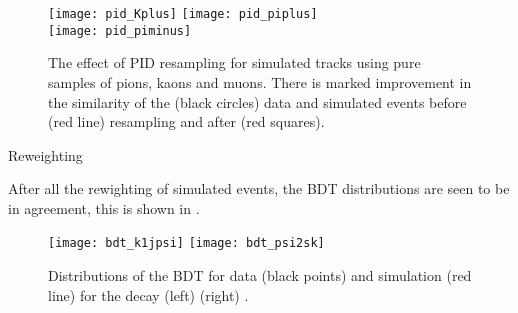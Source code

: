 \begin{figure}
  \begin{center}
    \texttt{[image: pid\_Kplus]}
    \texttt{[image: pid\_piplus]}\\
    \texttt{[image: pid\_piminus]}
    \caption{\small
      The effect of PID resampling for simulated tracks using pure samples of pions, kaons and
      muons.
      There is marked improvement in the similarity of the (black circles) \btojpsikpipi data and
      simulated events before (red line) resampling and after (red squares).
    }
    \label{fig:hhh:pid}
  \end{center}
\end{figure}

Reweighting

After all the rewighting of simulated events, the BDT distributions are seen to be in agreement,
this is shown in .











\begin{figure}
  \begin{center}
    \texttt{[image: bdt\_k1jpsi]}
    \texttt{[image: bdt\_psi2sk]}
    \caption{\small
      Distributions of the BDT for data (black points) and simulation (red line) for the decay
      (left) 
      (right) \btopsitwosk.
    }
    \label{fig:kpipi:bdt}
  \end{center}
\end{figure}





